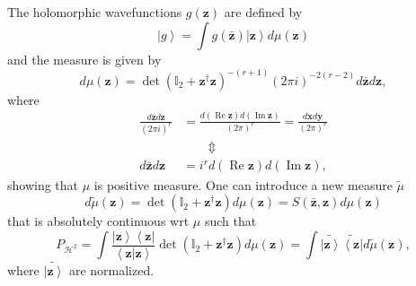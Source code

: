 \documentclass[aps,preprint]{revtex4}%
\begin{document}
The holomorphic wavefunctions $g\left(  \mathbf{z}\right)  $ are defined by
\begin{equation}
\left\vert g\right\rangle =\int g\left(  \mathbf{\bar{z}}\right)  \left\vert
\mathbf{z}\right\rangle d\mu\left(  \mathbf{z}\right)
\end{equation}
and the measure is given by
\begin{equation}
d\mu\left(  \mathbf{z}\right)  =\det\left(  \mathbb{I}_{2}+\mathbf{z}%
^{\dagger}\mathbf{z}\right)  ^{-\left(  r+1\right)  }\left(  2\pi i\right)
^{-2\left(  r-2\right)  }d\mathbf{\bar{z}}d\mathbf{z,}%
\end{equation}
where
\begin{align}
\frac{d\mathbf{\bar{z}}d\mathbf{z}}{\left(  2\pi i\right)  ^{r}}  &
=\frac{d\left(  \operatorname{Re}\mathbf{z}\right)  d\left(  \operatorname{Im}%
\mathbf{z}\right)  }{\left(  2\pi\right)  ^{r}}=\frac{d\mathbf{x}d\mathbf{y}%
}{\left(  2\pi\right)  ^{r}}\nonumber\\
&  \qquad\left.  \Updownarrow\right. \nonumber\\
d\mathbf{\bar{z}}d\mathbf{z}  &  =i^{r}d\left(  \operatorname{Re}%
\mathbf{z}\right)  d\left(  \operatorname{Im}\mathbf{z}\right)  ,
\end{align}
showing that $\mu$ is positive measure. One can introduce a new measure
$\tilde{\mu}$
\begin{equation}
d\tilde{\mu}\left(  \mathbf{z}\right)  =\det\left(  \mathbb{I}_{2}%
+\mathbf{z}^{\dagger}\mathbf{z}\right)  d\mu\left(  \mathbf{z}\right)
=S\left(  \mathbf{\bar{z},z}\right)  d\mu\left(  \mathbf{z}\right)
\end{equation}
that is absolutely continuous wrt $\mu$ such that
\begin{equation}
P_{\mathcal{H}^{2}}=\int\frac{\left\vert \mathbf{z}\right\rangle \left\langle
\mathbf{z}\right\vert }{\left\langle \mathbf{z}\left\vert \mathbf{z}\right.
\right\rangle }\det\left(  \mathbb{I}_{2}+\mathbf{z}^{\dagger}\mathbf{z}%
\right)  d\mu\left(  \mathbf{z}\right)  =\int\widetilde{\left\vert
\mathbf{z}\right\rangle }\widetilde{\left\langle \mathbf{z}\right\vert
}d\tilde{\mu}\left(  \mathbf{z}\right)  ,
\end{equation}
where $\widetilde{\left\vert \mathbf{z}\right\rangle }$ are normalized.
\end{document}
